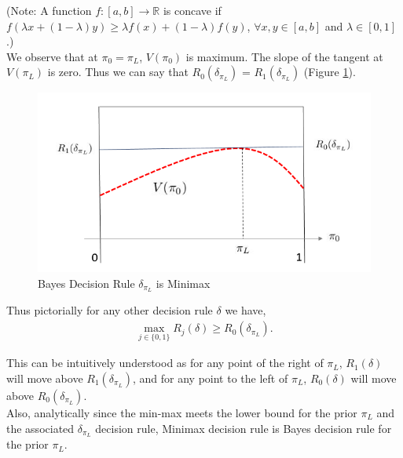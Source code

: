 \documentclass[12pt]{report}
\begin{document}
\noindent (Note: A function $f : [a,b] \to \mathbb{R}$ is concave if $f(\lambda x + (1-\lambda) y) \geq \lambda f(x) + (1-\lambda) f(y)$, \: $\forall x,y \in [a,b]$ and $\lambda \in [0,1]$.)\\

\noindent We observe that at $\pi_0 = \pi_L$, $V(\pi_0)$ is maximum. The slope of the tangent at $V(\pi_L)$ is zero. Thus we can say that $R_0(\delta_{\pi_L})$ = $R_1(\delta_{\pi_L})$ (Figure \ref{fig:BayesisMinimax}).

\begin{figure}[htbp]
	\begin{center}
		\includegraphics[scale = 0.6]{Figures/BayesisMinimax.png}
		\caption{Bayes Decision Rule $\delta_{\pi_L}$ is Minimax}
		\label{fig:BayesisMinimax}
	\end{center}
\end{figure}

\newpage
\noindent Thus pictorially for any other decision rule $\delta$ we have,
\begin{align*}
	\max_{j \in \{0,1\}}R_j(\delta) \geq R_0(\delta_{\pi_L}).
\end{align*}

\noindent This can be intuitively understood as for any point of the right of $\pi_L$, $R_1(\delta)$ will move above  $R_1(\delta_{\pi_L})$, and for any point to the left of $\pi_L$, $R_0(\delta)$ will move above  $R_0(\delta_{\pi_L})$.\\

\noindent Also, analytically since the min-max meets the lower bound for the prior $\pi_L$ and the associated $\delta_{\pi_L}$ decision rule, Minimax decision rule is Bayes decision rule for the prior $\pi_L$.\\
\end{document}
